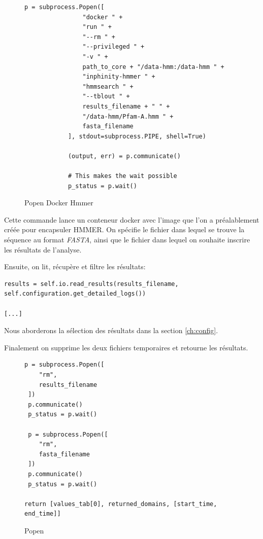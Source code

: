 \begin{figure}[H] 
\centering 
\begin{lstlisting}[frame=single]
p = subprocess.Popen([
                "docker " +
                "run " +
                "--rm " +
                "--privileged " +
                "-v " +
                path_to_core + "/data-hmm:/data-hmm " +
                "inphinity-hmmer " +
                "hmmsearch " +
                "--tblout " +
                results_filename + " " +
                "/data-hmm/Pfam-A.hmm " +
                fasta_filename
            ], stdout=subprocess.PIPE, shell=True)

            (output, err) = p.communicate()

            # This makes the wait possible
            p_status = p.wait()
\end{lstlisting} 
\caption[Popen Docker Hmmer]{Popen Docker Hmmer}
\label{fig:popenHmmer} 
\end{figure}

Cette commande lance un conteneur docker avec l'image que l'on a préalablement créée pour encapsuler HMMER. On spécifie le fichier dans lequel se trouve la séquence au format \emph{FASTA}, ainsi que le fichier dans lequel on souhaite inscrire les résultats de l'analyse.

Ensuite, on lit, récupère et filtre les résultats:

\begin{lstlisting}[frame=single]
results = self.io.read_results(results_filename, self.configuration.get_detailed_logs())

[...]
\end{lstlisting}

Nous aborderons la sélection des résultats dans la section \ref{ch:config}.

\newpage
Finalement on supprime les deux fichiers temporaires et  retourne les résultats.

\begin{figure}[H] 
\centering 
\begin{lstlisting}[frame=single]
p = subprocess.Popen([
	"rm",
	results_filename
 ])
 p.communicate()
 p_status = p.wait()

 p = subprocess.Popen([
 	"rm",
 	fasta_filename
 ])
 p.communicate()
 p_status = p.wait()

return [values_tab[0], returned_domains, [start_time, end_time]]
\end{lstlisting}
\caption[Popen remove]{Popen}
\label{fig:popen} 
\end{figure}

